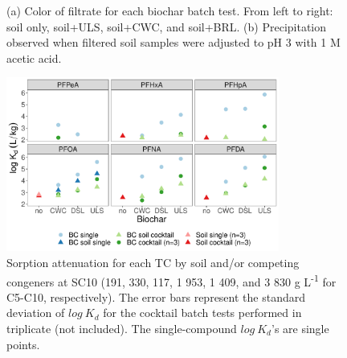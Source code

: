 \begin{figure}[htb]
\hfill
{}
\caption{(a) Color of filtrate for each biochar batch test. From left to right: soil only, soil+ULS, soil+CWC, and soil+BRL. (b) Precipitation observed when filtered soil samples were adjusted to pH 3 with 1 M acetic acid.}
\label{fig:DOC_tubes}
\end{figure}

\begin{figure}[htb]
    \centering
    \includegraphics[width=0.8\textwidth]{R/figs/C10.pdf}
    \caption{Sorption attenuation for each TC by soil and/or competing congeners at SC10 (191, 330, 117, 1 953, 1 409, and 3 830 \textmu g L\textsuperscript{-1} for C5-C10, respectively). The error bars represent the standard deviation of $log~K_d$ for the cocktail batch tests performed in triplicate (not included). The single-compound $log~K_d$'s are single points.}
    \label{fig:C10}
\end{figure}


